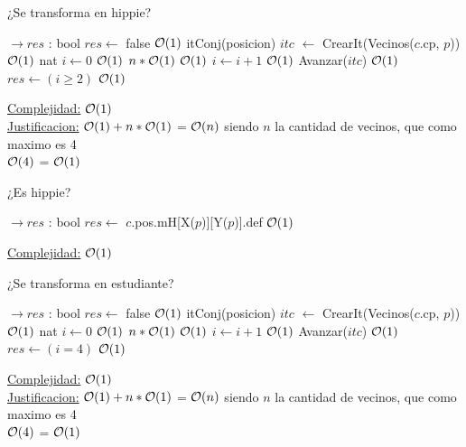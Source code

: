 \begin{Algoritmos}
\begin{algorithm}[H]
\caption{¿Se transforma en hippie?}
\begin{algorithmic}[1]
	 $\to res$ : bool
	\State $res \gets$ false \Comment $\mathcal{O}(1)$
	\State itConj(posicion) $itc$ $\gets$ CrearIt(Vecinos($c$.cp, $p$)) \Comment $\mathcal{O}(1)$
	\State nat $i \gets 0$ \Comment $\mathcal{O}(1)$
	 \Comment $n * \mathcal{O}(1)$
		 \Comment $\mathcal{O}(1)$
			\State $i \gets i+1$ \Comment $\mathcal{O}(1)$
		\EndIf
		\State Avanzar($itc$) \Comment $\mathcal{O}(1)$
	\EndWhile
	$res \gets (i \geq 2)$ \Comment $\mathcal{O}(1)$
	\EndProcedure
\end{algorithmic}
\underline{Complejidad:} $\mathcal{O}(1)$\\
\underline{Justificacion:} $\mathcal{O}(1) + n * \mathcal{O}(1)$ =  $\mathcal{O}(n)$ siendo $n$ la cantidad de vecinos, que como maximo es 4 \\
$\mathcal{O}(4)$ = $\mathcal{O}(1)$
\end{algorithm}


\begin{algorithm}[H]
\caption{¿Es hippie?}
\begin{algorithmic}[1]
	 $\to res$ : bool
	\State $res \gets$ $c$.pos.mH[X($p$)][Y($p$)].def \Comment $\mathcal{O}(1)$
	\EndProcedure
\end{algorithmic}
\underline{Complejidad:} $\mathcal{O}(1)$
\end{algorithm}


\begin{algorithm}[H]
\caption{¿Se transforma en estudiante?}
\begin{algorithmic}[1]
	 $\to res$ : bool
	\State $res \gets$ false \Comment $\mathcal{O}(1)$
	\State itConj(posicion) $itc$ $\gets$ CrearIt(Vecinos($c$.cp, $p$)) \Comment $\mathcal{O}(1)$
	\State nat $i \gets 0$ \Comment $\mathcal{O}(1)$
	  \Comment $n*\mathcal{O}(1)$
		  \Comment $\mathcal{O}(1)$
			\State $i \gets i+1$  \Comment $\mathcal{O}(1)$
		\EndIf
		\State Avanzar($itc$)  \Comment $\mathcal{O}(1)$
	\EndWhile
	$res \gets (i = 4)$  \Comment $\mathcal{O}(1)$
	\EndProcedure
\end{algorithmic}
\underline{Complejidad:} $\mathcal{O}(1)$\\
\underline{Justificacion:} $\mathcal{O}(1) + n * \mathcal{O}(1)$ =  $\mathcal{O}(n)$ siendo $n$ la cantidad de vecinos, que como maximo es 4 \\
$\mathcal{O}(4)$ = $\mathcal{O}(1)$
\end{algorithm}



\end{Algoritmos}
